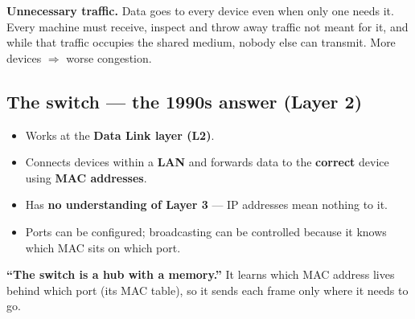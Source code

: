 \begin{center}
\end{center}

\begin{examtip}
\textbf{Unnecessary traffic.} Data goes to every device even when only one needs it. Every machine must receive, inspect and throw away traffic not meant for it, and while that traffic occupies the shared medium, nobody else can transmit. More devices $\Rightarrow$ worse congestion.
\end{examtip}

\subsection{The switch --- the 1990s answer (Layer 2)}
\begin{itemize}
  \item Works at the \textbf{Data Link layer (L2)}.
  \item Connects devices within a \textbf{LAN} and forwards data to the \textbf{correct} device using \textbf{MAC addresses}.
  \item Has \textbf{no understanding of Layer 3} --- IP addresses mean nothing to it.
  \item Ports can be configured; broadcasting can be controlled because it knows which MAC sits on which port.
\end{itemize}
\textbf{``The switch is a hub with a memory.''} It learns which MAC address lives behind which port (its MAC table), so it sends each frame only where it needs to go.

\begin{center}
\end{center}

